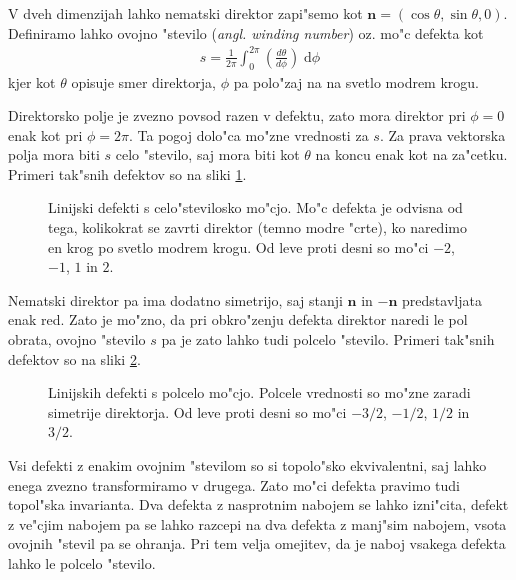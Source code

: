 \documentclass[12pt,twoside,openright,final]{report}
\renewcommand{\vec}{\mathbf}
\newcommand{\angl}[1]{(\textit{angl. #1})}
\newcommand{\dd}{\ensuremath{\;\mathrm{d}}}
\begin{document}
V dveh dimenzijah lahko nematski direktor zapi"semo kot $\vec n = (\cos\theta, \sin\theta, 0)$. 
Definiramo lahko ovojno "stevilo \angl{winding number} oz. mo"c defekta kot
\begin{align}
\label{eq:winding-number}
 s = \frac{1}{2\pi}\int_0^{2\pi} \left(\frac{d\theta}{d\phi}\right) \dd \phi
\end{align}
kjer kot $\theta$ opisuje smer direktorja, $\phi$ pa polo"zaj na na svetlo modrem krogu. 

Direktorsko polje je zvezno povsod razen v defektu, zato mora direktor pri $\phi = 0$ enak kot pri $\phi = 2\pi$. 
Ta pogoj dolo"ca mo"zne vrednosti za $s$. 
Za prava vektorska polja mora biti $s$ celo "stevilo, saj mora biti kot $\theta$ na koncu enak kot na za"cetku. 
Primeri tak"snih defektov so na sliki \ref{fig:defekti-celi}. 

\begin{figure}[h]
 \centering
 \caption{Linijski defekti s celo"stevilosko mo"cjo. Mo"c defekta je odvisna od tega, kolikokrat se zavrti direktor (temno modre "crte), ko naredimo en krog po svetlo modrem krogu. Od leve proti desni so mo"ci $-2$, $-1$, $1$ in $2$. }
 \label{fig:defekti-celi}
\end{figure}

Nematski direktor pa ima dodatno simetrijo, saj stanji $\vec n$ in $-\vec n$ predstavljata enak red. 
Zato je mo"zno, da pri obkro"zenju defekta direktor naredi le pol obrata, ovojno "stevilo $s$ pa je zato lahko tudi polcelo "stevilo. 
Primeri tak"snih defektov so na sliki \ref{fig:defekti-polceli}. 

\begin{figure}[h]
 \centering
 \caption{Linijskih defekti s polcelo mo"cjo. Polcele vrednosti so mo"zne zaradi simetrije direktorja. Od leve proti desni so mo"ci $-3/2$, $-1/2$, $1/2$ in $3/2$. }
 \label{fig:defekti-polceli}
\end{figure}

Vsi defekti z enakim ovojnim "stevilom so si topolo"sko ekvivalentni, saj lahko enega zvezno transformiramo v drugega. 
Zato mo"ci defekta pravimo tudi topol"ska invarianta. 
Dva defekta z nasprotnim nabojem se lahko izni"cita, defekt z ve"cjim nabojem pa se lahko razcepi na dva defekta z manj"sim nabojem, vsota ovojnih "stevil pa se ohranja. 
Pri tem velja omejitev, da je naboj vsakega defekta lahko le polcelo "stevilo. 
\end{document}
